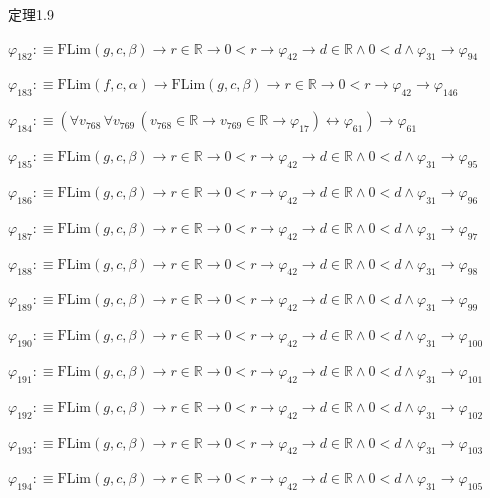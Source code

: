 \begin{fullproof}{定理1.9}
\begin{abbrevlist}
\item $\varphi_{182} :\equiv \mathrm{FLim}(g,c,\beta) \to r \in \mathbb{R} \to 0 < r \to \varphi_{42} \to d \in \mathbb{R} \land 0 < d \land \varphi_{31} \to \varphi_{94}$
\item $\varphi_{183} :\equiv \mathrm{FLim}(f,c,\alpha) \to \mathrm{FLim}(g,c,\beta) \to r \in \mathbb{R} \to 0 < r \to \varphi_{42} \to \varphi_{146}$
\item $\varphi_{184} :\equiv (\forall v_{768}\,\forall v_{769}\,(v_{768} \in \mathbb{R} \to v_{769} \in \mathbb{R} \to \varphi_{17}) \leftrightarrow \varphi_{61}) \to \varphi_{61}$
\item $\varphi_{185} :\equiv \mathrm{FLim}(g,c,\beta) \to r \in \mathbb{R} \to 0 < r \to \varphi_{42} \to d \in \mathbb{R} \land 0 < d \land \varphi_{31} \to \varphi_{95}$
\item $\varphi_{186} :\equiv \mathrm{FLim}(g,c,\beta) \to r \in \mathbb{R} \to 0 < r \to \varphi_{42} \to d \in \mathbb{R} \land 0 < d \land \varphi_{31} \to \varphi_{96}$
\item $\varphi_{187} :\equiv \mathrm{FLim}(g,c,\beta) \to r \in \mathbb{R} \to 0 < r \to \varphi_{42} \to d \in \mathbb{R} \land 0 < d \land \varphi_{31} \to \varphi_{97}$
\item $\varphi_{188} :\equiv \mathrm{FLim}(g,c,\beta) \to r \in \mathbb{R} \to 0 < r \to \varphi_{42} \to d \in \mathbb{R} \land 0 < d \land \varphi_{31} \to \varphi_{98}$
\item $\varphi_{189} :\equiv \mathrm{FLim}(g,c,\beta) \to r \in \mathbb{R} \to 0 < r \to \varphi_{42} \to d \in \mathbb{R} \land 0 < d \land \varphi_{31} \to \varphi_{99}$
\item $\varphi_{190} :\equiv \mathrm{FLim}(g,c,\beta) \to r \in \mathbb{R} \to 0 < r \to \varphi_{42} \to d \in \mathbb{R} \land 0 < d \land \varphi_{31} \to \varphi_{100}$
\item $\varphi_{191} :\equiv \mathrm{FLim}(g,c,\beta) \to r \in \mathbb{R} \to 0 < r \to \varphi_{42} \to d \in \mathbb{R} \land 0 < d \land \varphi_{31} \to \varphi_{101}$
\item $\varphi_{192} :\equiv \mathrm{FLim}(g,c,\beta) \to r \in \mathbb{R} \to 0 < r \to \varphi_{42} \to d \in \mathbb{R} \land 0 < d \land \varphi_{31} \to \varphi_{102}$
\item $\varphi_{193} :\equiv \mathrm{FLim}(g,c,\beta) \to r \in \mathbb{R} \to 0 < r \to \varphi_{42} \to d \in \mathbb{R} \land 0 < d \land \varphi_{31} \to \varphi_{103}$
\item $\varphi_{194} :\equiv \mathrm{FLim}(g,c,\beta) \to r \in \mathbb{R} \to 0 < r \to \varphi_{42} \to d \in \mathbb{R} \land 0 < d \land \varphi_{31} \to \varphi_{105}$

\end{abbrevlist}
\end{fullproof}
